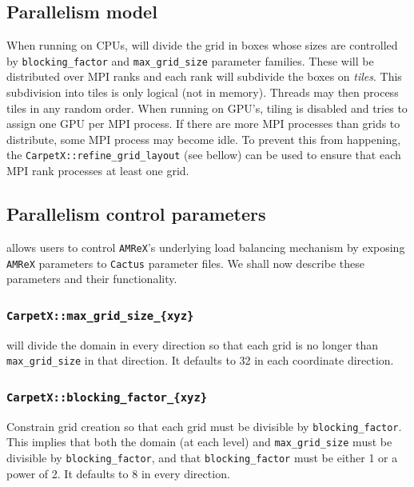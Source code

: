 \subsection{Parallelism model}

When running on CPUs, \AMReX\space will divide the grid in boxes whose sizes are controlled by \texttt{blocking\_factor} and \texttt{max\_grid\_size} parameter families. These will be distributed over MPI ranks and each rank will subdivide the boxes on \textit{tiles}. This subdivision into tiles is only logical (not in memory). Threads may then process tiles in any random order. When running on GPU's, tiling is disabled and \AMReX\space tries to assign one GPU per MPI process. If there are more MPI processes than grids to distribute, some MPI process may become idle. To prevent this from happening, the \texttt{CarpetX::refine\_grid\_layout} (see bellow) can be used to ensure that each MPI rank processes at least one grid.

\subsection{Parallelism control parameters}

\CarpetX\space allows users to control \texttt{AMReX}'s underlying load balancing mechanism by exposing \texttt{AMReX} parameters to \texttt{Cactus} parameter files. We shall now describe these parameters and their functionality.

\subsubsection{\texttt{CarpetX::max\_grid\_size\_\{xyz\}}}

\AMReX\space will divide the domain in every direction so that each grid is no longer than \texttt{max\_grid\_size} in that direction. It defaults to 32 in each coordinate direction.

\subsubsection{\texttt{CarpetX::blocking\_factor\_\{xyz\}}}

Constrain grid creation so that each grid must be divisible by \texttt{blocking\_factor}. This implies that both the domain (at each level) and \texttt{max\_grid\_size} must be divisible by \texttt{blocking\_factor}, and that \texttt{blocking\_factor} must be either 1 or a power of 2. It defaults to 8 in every direction.

